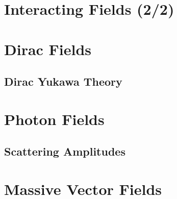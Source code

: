 \documentclass[12pt]{article}
\newcommand{\myqftsrcdirectory}[0]{myqft/src}
\newcommand{\mainqftsrcdirectory}[0]{src_qft}
\newcommand{\srcseventeen}[0]{myqft/versions/2017}
\begin{document}
\section{Interacting Fields (2/2)}

\label{sec:InteractingFields2}

\newpage
\section{Dirac Fields}
%


\subsection{Dirac Yukawa Theory}
\label{sec:DiracYukawa}




\begin{comment}
\subsection{Majorana Field}
Massless, spin1/2, selfconjugate.
\begin{equation}
i \slashed{\partial} \psi(x) = 0\,,
\hspace{3mm}
\bar{\psi}(x) i \stackrel{\leftarrow}{\slashed{\partial}}   = 0
\end{equation}
\end{comment}

\newpage
\section{Photon Fields}
%



\subsection{Scattering Amplitudes}



\newpage
\section{Massive Vector  Fields}

\end{document}
